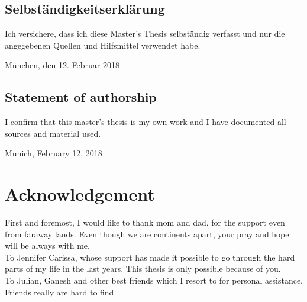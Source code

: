 \documentclass[pdftex,12pt,a4paper]{report}
\begin{document}

{\parindent 0cm

\vspace{80mm}
  
  \section*{Selbst\"andigkeitserkl\"arung}
  Ich versichere, dass ich diese Master's Thesis selbst\"andig verfasst und nur die angegebenen Quellen und Hilfsmittel verwendet habe.
  \vspace{3\baselineskip}
  
  M\"unchen, den 12. Februar 2018 \hspace{0.1\linewidth}\parbox{0.3\linewidth}{\dotfill}


\section*{Statement of authorship}
I confirm that this master's thesis is my own work and I have documented all sources and material used.

  \vspace{3\baselineskip}
  
  Munich, February 12, 2018  \hspace{0.1\linewidth}\parbox{0.3\linewidth}{\dotfill}
}

\newpage

\chapter*{Acknowledgement}

First and foremost, I would like to thank mom and dad, for the support even from faraway lands. Even though we are continents apart, your pray and hope will be always with me.\\

To Jennifer Carissa, whose support has made it possible to go through the hard parts of my life in the last years. This thesis is only possible because of you.\\

To Julian, Ganesh and other best friends which I resort to for personal assistance. Friends really are hard to find.\\
\end{document}
